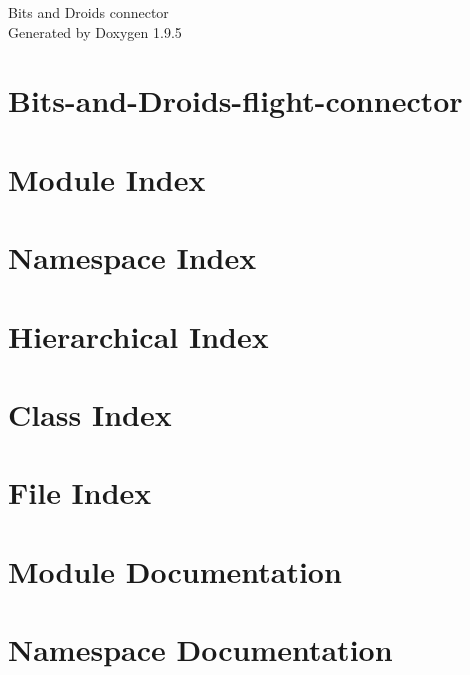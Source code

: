 \documentclass[twoside]{book}
\newcommand{\+}{\discretionary{\mbox{\scriptsize$\hookleftarrow$}}{}{}}
\newcommand{\clearemptydoublepage}{%
    \newpage{\pagestyle{empty}\cleardoublepage}%
  }
\begin{document}
  \raggedbottom
    \hypersetup{pageanchor=false,
                bookmarksnumbered=true,
                pdfencoding=unicode
               }
  \begin{titlepage}
  \vspace*{7cm}
  \begin{center}%
  {\Large Bits and Droids connector}\\
  \vspace*{1cm}
  {\large Generated by Doxygen 1.9.5}\\
  \end{center}
  \end{titlepage}
  \clearemptydoublepage
  \tableofcontents
  \clearemptydoublepage
  \hypersetup{pageanchor=true}
\chapter{Bits-\/and-\/\+Droids-\/flight-\/connector}
\label{md__r_e_a_d_m_e}

\chapter{Module Index}

\chapter{Namespace Index}

\chapter{Hierarchical Index}

\chapter{Class Index}

\chapter{File Index}

\chapter{Module Documentation}

\chapter{Namespace Documentation}



\end{document}
